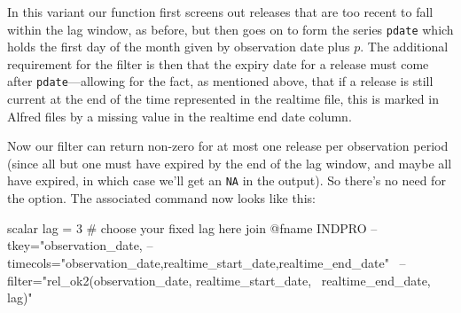 In this variant our function first screens out releases that are too
recent to fall within the lag window, as before, but then goes on to
form the series \texttt{pdate} which holds the first day of the month
given by observation date plus $p$. The additional requirement for the
filter is then that the expiry date for a release must come after
\texttt{pdate}---allowing for the fact, as mentioned above, that if a
release is still current at the end of the time represented in the
realtime file, this is marked in Alfred files by a missing value in
the realtime end date column.

Now our filter can return non-zero for at most one release per
observation period (since all but one must have expired by the end of
the lag window, and maybe all have expired, in which case we'll get an
\texttt{NA} in the output). So there's no need for the 
option. The associated command now looks like this:

\begin{code}
scalar lag = 3  # choose your fixed lag here
join @fname INDPRO --tkey="observation_date,%
--timecols="observation_date,realtime_start_date,realtime_end_date" \
--filter="rel_ok2(observation_date, realtime_start_date, \
 realtime_end_date, lag)"
\end{code}